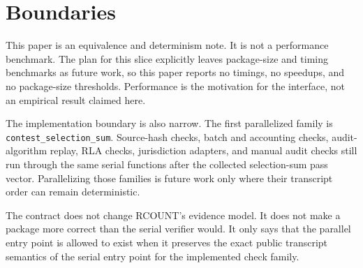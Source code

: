 \section{Boundaries}

This paper is an equivalence and determinism note. It is not a performance
benchmark. The plan for this slice explicitly leaves package-size and timing
benchmarks as future work, so this paper reports no timings, no speedups, and
no package-size thresholds. Performance is the motivation for the interface,
not an empirical result claimed here.

The implementation boundary is also narrow. The first parallelized family is
\texttt{contest\_selection\_sum}. Source-hash checks, batch and accounting
checks, audit-algorithm replay, RLA checks, jurisdiction adapters, and manual
audit checks still run through the same serial functions after the collected
selection-sum pass vector. Parallelizing those families is future work only
where their transcript order can remain deterministic.

The contract does not change RCOUNT's evidence model. It does not make a package
more correct than the serial verifier would. It only says that the parallel
entry point is allowed to exist when it preserves the exact public transcript
semantics of the serial entry point for the implemented check family.
